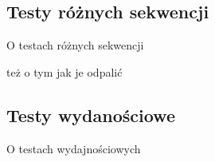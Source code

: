 


\subsection{Testy różnych sekwencji}

O testach różnych sekwencji

też o tym jak je odpalić


\subsection{Testy wydanościowe}



O testach wydajnościowych